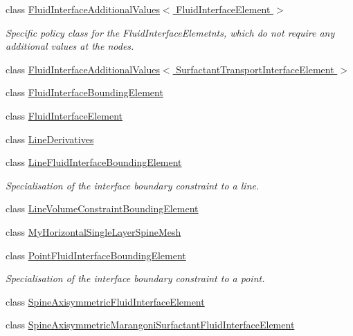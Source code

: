 \begin{DoxyCompactItemize}
class \hyperlink{classoomph_1_1FluidInterfaceAdditionalValues_3_01FluidInterfaceElement_01_4}{Fluid\+Interface\+Additional\+Values$<$ Fluid\+Interface\+Element $>$}
\begin{DoxyCompactList}\small\item\em Specific policy class for the Fluid\+Interface\+Elemetnts, which do not require any additional values at the nodes. \end{DoxyCompactList}\item 
class \hyperlink{classoomph_1_1FluidInterfaceAdditionalValues_3_01SurfactantTransportInterfaceElement_01_4}{Fluid\+Interface\+Additional\+Values$<$ Surfactant\+Transport\+Interface\+Element $>$}
\item 
class \hyperlink{classoomph_1_1FluidInterfaceBoundingElement}{Fluid\+Interface\+Bounding\+Element}
\item 
class \hyperlink{classoomph_1_1FluidInterfaceElement}{Fluid\+Interface\+Element}
\item 
class \hyperlink{classoomph_1_1LineDerivatives}{Line\+Derivatives}
\item 
class \hyperlink{classoomph_1_1LineFluidInterfaceBoundingElement}{Line\+Fluid\+Interface\+Bounding\+Element}
\begin{DoxyCompactList}\small\item\em Specialisation of the interface boundary constraint to a line. \end{DoxyCompactList}\item 
class \hyperlink{classoomph_1_1LineVolumeConstraintBoundingElement}{Line\+Volume\+Constraint\+Bounding\+Element}
\item 
class \hyperlink{classoomph_1_1MyHorizontalSingleLayerSpineMesh}{My\+Horizontal\+Single\+Layer\+Spine\+Mesh}
\item 
class \hyperlink{classoomph_1_1PointFluidInterfaceBoundingElement}{Point\+Fluid\+Interface\+Bounding\+Element}
\begin{DoxyCompactList}\small\item\em Specialisation of the interface boundary constraint to a point. \end{DoxyCompactList}\item 
class \hyperlink{classoomph_1_1SpineAxisymmetricFluidInterfaceElement}{Spine\+Axisymmetric\+Fluid\+Interface\+Element}
\item 
class \hyperlink{classoomph_1_1SpineAxisymmetricMarangoniSurfactantFluidInterfaceElement}{Spine\+Axisymmetric\+Marangoni\+Surfactant\+Fluid\+Interface\+Element}
\item 

\end{DoxyCompactItemize}
